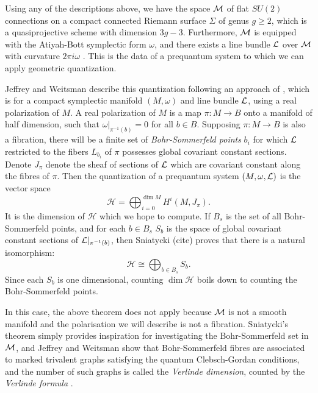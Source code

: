 
	Using any of the descriptions above, we have the space $\mathcal{M}$ of flat $SU(2)$ connections on a compact connected Riemann surface $\Sigma$ of genus $g\geq 2$, which is a quasiprojective scheme with dimension $3g-3$. Furthermore, $\mathcal{M}$ is equipped with the Atiyah-Bott symplectic form $\omega$, and there exists a line bundle $\mathcal{L}$ over $\mathcal{M}$ with curvature $2\pi i \omega$ \cite{quillen_determinants_1985}\cite{ramadas_comments_1989}. This is the data of a prequantum system to which we can apply geometric quantization.
	
	Jeffrey and Weitsman describe this quantization following an approach of \cite{weitsman_real_1992}, which is for a compact symplectic manifold $(M,\omega)$ and line bundle $\mathcal{L}$, using a real polarization of $M$. A real polarization of $M$ is a map $\pi:M\to B$ onto a manifold of half dimension, such that $\omega|_{\pi^{-1}(b)} =0$ for all $b\in B$. Supposing $\pi:M\to B$ is also a fibration, there will be a finite set of \textit{Bohr-Sommerfeld points} $b_i$ for which $\mathcal{L}$ restricted to the fibers $L_{b_i}$ of $\pi$ possesses global covariant constant sections. Denote $J_\pi$ denote the sheaf of sections of $\mathcal{L}$ which are covariant constant along the fibres of $\pi$. Then the quantization of a prequantum system $(M,\omega,\mathcal{L})$ is the vector space
	\begin{equation}
		\mathcal{H} = \bigoplus_{i=0}^{\dim M} H^i(M,J_\pi).
	\end{equation}
	It is the dimension of $\mathcal{H}$ which we hope to compute. If $B_s$ is the set of all Bohr-Sommerfeld points, and for each $b\in B_s$ $S_b$ is the space of global covariant constant sections of $\mathcal{L}|_{\pi^{-1}(b)}$, then Sniatycki (cite) proves that there is a natural isomorphism:
	\begin{equation}
		\mathcal{H} \cong \bigoplus_{b\in B_s} S_b.
	\end{equation}
	Since each $S_b$ is one dimensional, counting $\dim \mathcal{H}$ boils down to counting the Bohr-Sommerfeld points. 
	
	In this case, the above theorem does not apply because $\mathcal{M}$ is not a smooth manifold and the polarisation we will describe is not a fibration. Sniatycki's theorem simply provides inspiration for investigating the Bohr-Sommerfeld set in $\mathcal{M}$, and Jeffrey and Weitsman show that Bohr-Sommerfeld fibres are associated to marked trivalent graphs satisfying the quantum Clebsch-Gordan conditions, and the number of such graphs is called the \emph{Verlinde dimension}, counted by the \emph{Verlinde formula} \cite[Thm. 8.1]{jeffrey_bohr-sommerfeld_1992}.

